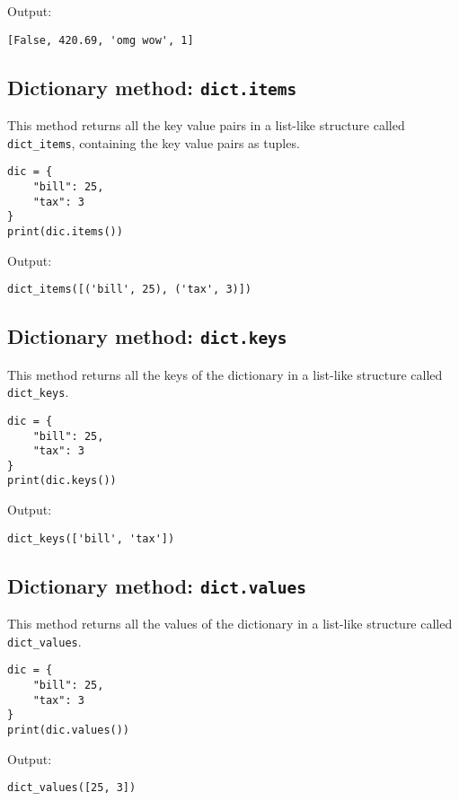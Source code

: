 \documentclass[11pt]{article}
\begin{document}
 \noindent Output:

\label{orgda727fe}
\begin{verbatim}
[False, 420.69, 'omg wow', 1]
\end{verbatim}
\subsection{Dictionary method: \texttt{dict.items}}
\label{sec:org6495f4b}
This method returns all the key value pairs in a list-like structure called \texttt{dict\_items}, containing the key value pairs as tuples.
\begin{verbatim}
dic = {
    "bill": 25,
    "tax": 3
}
print(dic.items())
\end{verbatim}

 \noindent Output:

\label{orgacb3613}
\begin{verbatim}
dict_items([('bill', 25), ('tax', 3)])
\end{verbatim}
\subsection{Dictionary method: \texttt{dict.keys}}
\label{sec:orgb835e3a}
This method returns all the keys of the dictionary in a list-like structure called \texttt{dict\_keys}.
\begin{verbatim}
dic = {
    "bill": 25,
    "tax": 3
}
print(dic.keys())
\end{verbatim}

 \noindent Output:

\label{orgc2bee13}
\begin{verbatim}
dict_keys(['bill', 'tax'])
\end{verbatim}
\subsection{Dictionary method: \texttt{dict.values}}
\label{sec:org9907c1b}
This method returns all the values of the dictionary in a list-like structure called \texttt{dict\_values}.
\begin{verbatim}
dic = {
    "bill": 25,
    "tax": 3
}
print(dic.values())
\end{verbatim}

 \noindent Output:

\label{org5a16540}
\begin{verbatim}
dict_values([25, 3])
\end{verbatim}
\end{document}
